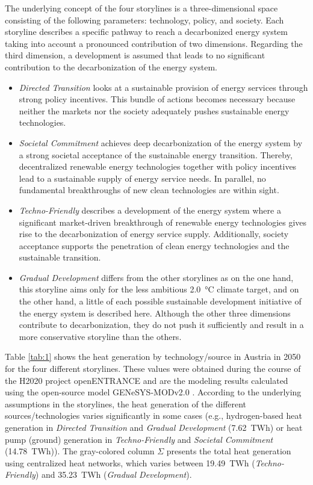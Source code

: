 The underlying concept of the four storylines is a three-dimensional space consisting of the following parameters: technology, policy, and society. Each storyline describes a specific pathway to reach a decarbonized energy system taking into account a pronounced contribution of two dimensions. Regarding the third dimension, a development is assumed that leads to no significant contribution to the decarbonization of the energy system. 

\begin{itemize}
	\item \textit{Directed Transition} looks at a sustainable provision of energy services through strong policy incentives. This bundle of actions becomes necessary because neither the markets nor the society adequately pushes sustainable energy technologies.
	\item \textit{Societal Commitment} achieves deep decarbonization of the energy system by a strong societal acceptance of the sustainable energy transition. Thereby, decentralized renewable energy technologies together with policy incentives lead to a sustainable supply of energy service needs. In parallel, no fundamental breakthroughs of new clean technologies are within sight.
	\item \textit{Techno-Friendly} describes a development of the energy system where a significant market-driven breakthrough of renewable energy technologies gives rise to the decarbonization of energy service supply. Additionally, society acceptance supports the penetration of clean energy technologies and the sustainable transition.
	\item \textit{Gradual Development} differs from the other storylines as on the one hand, this storyline aims only for the less ambitious \SI{2.0}{\degreeCelsius} climate target, and on the other hand, a little of each possible sustainable development initiative of the energy system is described here. Although the other three dimensions contribute to decarbonization, they do not push it sufficiently and result in a more conservative storyline than the others.
\end{itemize}

Table \ref{tab:1} shows the heat generation by technology/source in Austria in 2050 for the four different storylines. These values were obtained during the course of the H2020 project openENTRANCE and are the modeling results calculated using the open-source model GENeSYS-MODv2.0 \cite{burandt2018genesys}. According to the underlying assumptions in the storylines, the heat generation of the different sources/technologies varies significantly in some cases (e.g., hydrogen-based heat generation in \textit{Directed Transition} and \textit{Gradual Development} (\SI{7.62}{TWh}) or heat pump (ground) generation in \textit{Techno-Friendly} and \textit{Societal Commitment} (\SI{14.78}{TWh})). The gray-colored column $\Sigma$ presents the total heat generation using centralized heat networks, which varies between \SI{19.49}{TWh} (\textit{Techno-Friendly}) and \SI{35.23}{TWh} (\textit{Gradual Development}).

